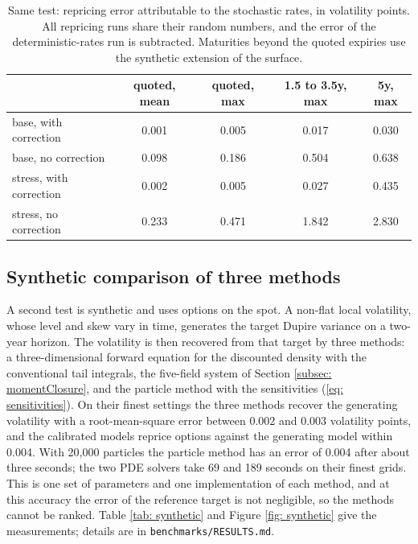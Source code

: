\begin{table}[h]
\centering\small
\begin{tabular}{lcccc}
\toprule
 & quoted, mean & quoted, max & 1.5 to 3.5y, max & 5y, max \\
\midrule
base, with correction & 0.001 & 0.005 & 0.017 & 0.030 \\
base, no correction & 0.098 & 0.186 & 0.504 & 0.638 \\
stress, with correction & 0.002 & 0.005 & 0.027 & 0.435 \\
stress, no correction & 0.233 & 0.471 & 1.842 & 2.830 \\
\bottomrule
\end{tabular}
\caption{Same test: repricing error attributable to the stochastic rates, in volatility points. All repricing runs share their random numbers, and the error of the deterministic-rates run is subtracted. Maturities beyond the quoted expiries use the synthetic extension of the surface.}\label{tab: cmeRates}
\end{table}

\subsection{Synthetic comparison of three methods}\label{subsec: synthetic}
A second test is synthetic and uses options on the spot. A non-flat local volatility, whose level and skew vary in time, generates the target Dupire variance on a two-year horizon. The volatility is then recovered from that target by three methods: a three-dimensional forward equation for the discounted density with the conventional tail integrals, the five-field system of Section \ref{subsec: momentClosure}, and the particle method with the sensitivities (\ref{eq: sensitivities}). On their finest settings the three methods recover the generating volatility with a root-mean-square error between 0.002 and 0.003 volatility points, and the calibrated models reprice options against the generating model within 0.004. With 20,000 particles the particle method has an error of 0.004 after about three seconds; the two PDE solvers take 69 and 189 seconds on their finest grids. This is one set of parameters and one implementation of each method, and at this accuracy the error of the reference target is not negligible, so the methods cannot be ranked. Table \ref{tab: synthetic} and Figure \ref{fig: synthetic} give the measurements; details are in \texttt{benchmarks/RESULTS.md}.

